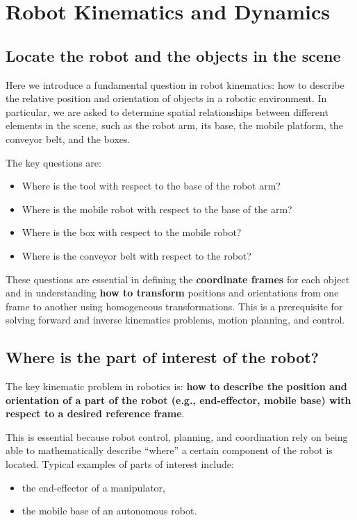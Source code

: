 \section{Robot Kinematics and Dynamics}

\subsection{Locate the robot and the objects in the scene}

Here we introduce a fundamental question in robot kinematics: how to describe the relative position and orientation of objects in a robotic environment. In particular, we are asked to determine spatial relationships between different elements in the scene, such as the robot arm, its base, the mobile platform, the conveyor belt, and the boxes.

The key questions are:

\begin{itemize}
  \item Where is the tool with respect to the base of the robot arm?
  \item Where is the mobile robot with respect to the base of the arm?
  \item Where is the box with respect to the mobile robot?
  \item Where is the conveyor belt with respect to the robot?
\end{itemize}

These questions are essential in defining the \textbf{coordinate frames} for each object and in understanding \textbf{how to transform} positions and orientations from one frame to another using homogeneous transformations. This is a prerequisite for solving forward and inverse kinematics problems, motion planning, and control.

\hfill

\subsection{Where is the part of interest of the robot?}

The key kinematic problem in robotics is: \textbf{how to describe the position and orientation of a part of the robot (e.g., end-effector, mobile base) with respect to a desired reference frame}.

This is essential because robot control, planning, and coordination rely on being able to mathematically describe “where” a certain component of the robot is located. Typical examples of parts of interest include:
\begin{itemize}
  \item the end-effector of a manipulator,
  \item the mobile base of an autonomous robot.
\end{itemize}

